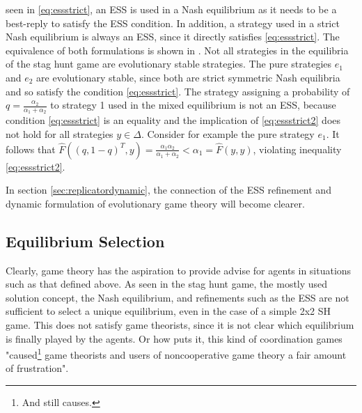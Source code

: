 \documentclass[11pt]{article}
\begin{document}
seen in \eqref{eq:essstrict}, an ESS is used in a Nash equilibrium as it 
needs to be a best-reply to satisfy the ESS condition. In addition, 
a strategy used in a strict Nash equilibrium is always an ESS, 
since it directly satisfies 
\eqref{eq:essstrict}. The equivalence of both formulations is shown in
\textcite{weibull_evolutionary_1997}.
Not all strategies in the equilibria of the stag hunt game are evolutionary
stable strategies. The pure strategies $e_1$ and $e_2$ are evolutionary stable,
since both are strict symmetric Nash equilibria and so 
satisfy the condition \eqref{eq:essstrict}. The strategy assigning 
a probability of $q=\frac{\alpha_2}{\alpha_1 + \alpha_2}$ to strategy 1 used in the 
mixed equilibrium is not an ESS, because condition \eqref{eq:essstrict} is
an equality and the implication of \eqref{eq:essstrict2} does not hold for all
strategies $y \in \Delta$.
Consider for example the pure strategy $e_1$. It follows that
$\hat{F}((q,1-q)^T,y) = \frac{\alpha_1 \alpha_2}{\alpha_1+\alpha_2}
< \alpha_1 = \hat{F}(y,y)$, violating inequality \eqref{eq:essstrict2}.

In section \ref{sec:replicatordynamic}, the connection of the ESS refinement
and dynamic formulation of evolutionary game theory will become clearer. 

\subsection{Equilibrium Selection}
\label{sec:equilibriumselection}
Clearly, game theory has the aspiration to provide advise for agents in 
situations such as that defined above.
As seen in the stag hunt game, the mostly used solution concept, 
the Nash equilibrium, and refinements such as the ESS are
not sufficient to select a unique equilibrium, even in the case of a simple
2x2 SH game. This does not satisfy game theorists, since it is not clear which
equilibrium is finally played by the agents. Or how 
\textcite{weibull_evolutionary_1997} puts it, this kind of coordination games 
"caused\footnote{And still causes.} game theorists and users of 
noncooperative game theory a fair amount of frustration". 
\end{document}
